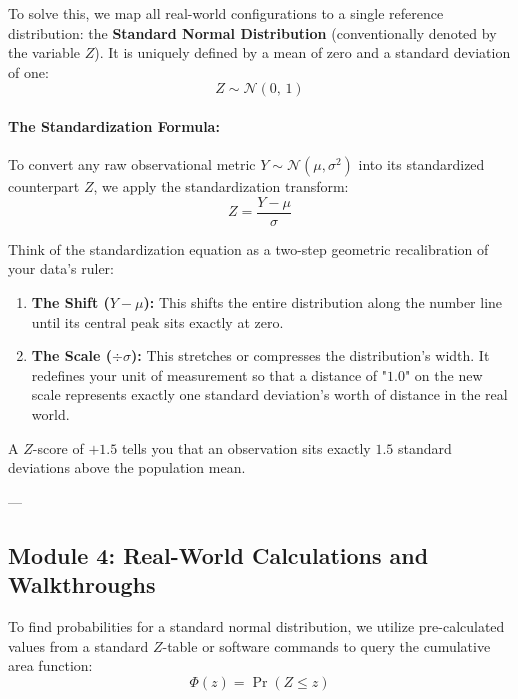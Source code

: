 \documentclass{article}
\begin{document}
To solve this, we map all real-world configurations to a single reference distribution: the \textbf{Standard Normal Distribution} (conventionally denoted by the variable $Z$). It is uniquely defined by a mean of zero and a standard deviation of one:
\begin{equation}
    Z \sim \mathcal{N}(0, \, 1)
\end{equation}

\paragraph{The Standardization Formula:}
To convert any raw observational metric $Y \sim \mathcal{N}(\mu, \sigma^2)$ into its standardized counterpart $Z$, we apply the standardization transform:
\begin{equation}
    Z = \frac{Y - \mu}{\sigma}
\end{equation}

\begin{tcolorbox}[colback=blue!5!white, colframe=blue!60!black, title=Conceptual Analogy: Shifting and Scaling the Ruler]
Think of the standardization equation as a two-step geometric recalibration of your data's ruler:
\begin{enumerate}
    \item \textbf{The Shift ($Y - \mu$):} This shifts the entire distribution along the number line until its central peak sits exactly at zero.
    \item \textbf{The Scale ($\div \sigma$):} This stretches or compresses the distribution's width. It redefines your unit of measurement so that a distance of "$1.0$" on the new scale represents exactly one standard deviation's worth of distance in the real world.
\end{enumerate}
A $Z$-score of $+1.5$ tells you that an observation sits exactly $1.5$ standard deviations above the population mean.
\end{tcolorbox}

---

\subsection*{Module 4: Real-World Calculations and Walkthroughs}
To find probabilities for a standard normal distribution, we utilize pre-calculated values from a standard $Z$-table or software commands to query the cumulative area function:
\begin{equation}
    \Phi(z) = \Pr(Z \le z)
\end{equation}
\end{document}
